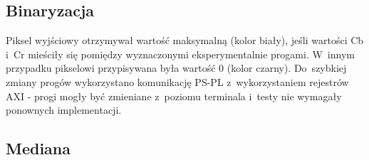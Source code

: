 \subsection{Binaryzacja}
\label{subsec:Binaryzacja}
Piksel wyjściowy otrzymywał wartość maksymalną (kolor biały), jeśli wartości Cb i~Cr mieściły się pomiędzy wyznaczonymi eksperymentalnie progami.  
W~innym przypadku pikselowi przypisywana była wartość 0 (kolor czarny). 
Do~szybkiej zmiany progów wykorzystano komunikację PS-PL z~wykorzystaniem rejestrów AXI - progi mogły być zmieniane z~poziomu terminala i~testy nie wymagały ponownych implementacji.  



\subsection{Mediana}
\label{subsec:Mediana}

